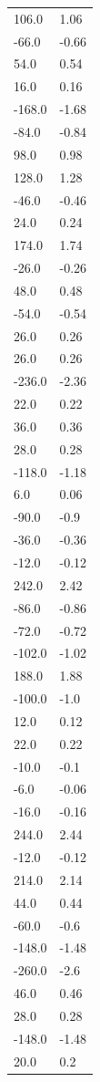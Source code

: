 \begin{longtable}{ll}
106.0 & 1.06 \\
-66.0 & -0.66 \\
54.0 & 0.54 \\
16.0 & 0.16 \\
-168.0 & -1.68 \\
-84.0 & -0.84 \\
98.0 & 0.98 \\
128.0 & 1.28 \\
-46.0 & -0.46 \\
24.0 & 0.24 \\
174.0 & 1.74 \\
-26.0 & -0.26 \\
48.0 & 0.48 \\
-54.0 & -0.54 \\
26.0 & 0.26 \\
26.0 & 0.26 \\
-236.0 & -2.36 \\
22.0 & 0.22 \\
36.0 & 0.36 \\
28.0 & 0.28 \\
-118.0 & -1.18 \\
6.0 & 0.06 \\
-90.0 & -0.9 \\
-36.0 & -0.36 \\
-12.0 & -0.12 \\
242.0 & 2.42 \\
-86.0 & -0.86 \\
-72.0 & -0.72 \\
-102.0 & -1.02 \\
188.0 & 1.88 \\
-100.0 & -1.0 \\
12.0 & 0.12 \\
22.0 & 0.22 \\
-10.0 & -0.1 \\
-6.0 & -0.06 \\
-16.0 & -0.16 \\
244.0 & 2.44 \\
-12.0 & -0.12 \\
214.0 & 2.14 \\
44.0 & 0.44 \\
-60.0 & -0.6 \\
-148.0 & -1.48 \\
-260.0 & -2.6 \\
46.0 & 0.46 \\
28.0 & 0.28 \\
-148.0 & -1.48 \\
20.0 & 0.2 \\

\end{longtable}
